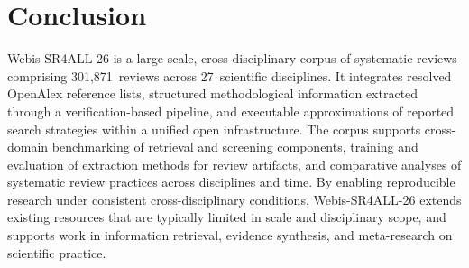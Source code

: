 \section{Conclusion}

Webis-SR4ALL-26 is a large-scale, cross-disciplinary corpus of systematic reviews comprising 301,871~reviews across 27~scientific disciplines. It integrates resolved OpenAlex reference lists, structured methodological information extracted through a verification-based pipeline, and executable approximations of reported search strategies within a unified open infrastructure. The corpus supports cross-domain benchmarking of retrieval and screening components, training and evaluation of extraction methods for review artifacts, and comparative analyses of systematic review practices across disciplines and time. By enabling reproducible research under consistent cross-disciplinary conditions, Webis-SR4ALL-26 extends existing resources that are typically limited in scale and disciplinary scope, and supports work in information retrieval, evidence synthesis, and meta-research on scientific practice.


